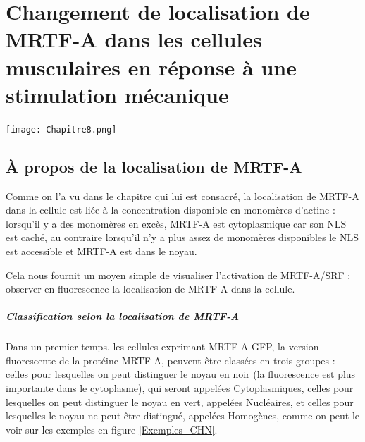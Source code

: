 %
%
%

\chapter{Changement de localisation de MRTF-A dans les cellules musculaires en réponse à une stimulation mécanique}

\begin{center}
\texttt{[image: Chapitre8.png]}
\end{center}

\newpage
\section{À propos de la localisation de MRTF-A}

 Comme on l'a vu dans le chapitre qui lui est consacré, la localisation de MRTF-A dans la cellule est liée à la concentration disponible en monomères d'actine : lorsqu'il y a des monomères en excès, MRTF-A est cytoplasmique car son NLS est caché, au contraire lorsqu'il n'y a plus assez de monomères disponibles le NLS est accessible et MRTF-A est dans le noyau. 
 
 Cela nous fournit un moyen simple de visualiser l'activation de MRTF-A/SRF : observer en fluorescence la localisation de MRTF-A dans la cellule. 
 
 \paragraph{Classification selon la localisation de MRTF-A}
 
 Dans un premier temps, les cellules exprimant MRTF-A GFP, la version fluorescente de la protéine MRTF-A, peuvent être classées en trois groupes : celles pour lesquelles on peut distinguer le noyau en noir (la fluorescence est plus importante dans le cytoplasme), qui seront appelées Cytoplasmiques, celles pour lesquelles on peut distinguer le noyau en vert, appelées Nucléaires, et celles pour lesquelles le noyau ne peut être distingué, appelées Homogènes, comme on peut le voir sur les exemples en figure  \ref{Exemples_CHN}.
 
